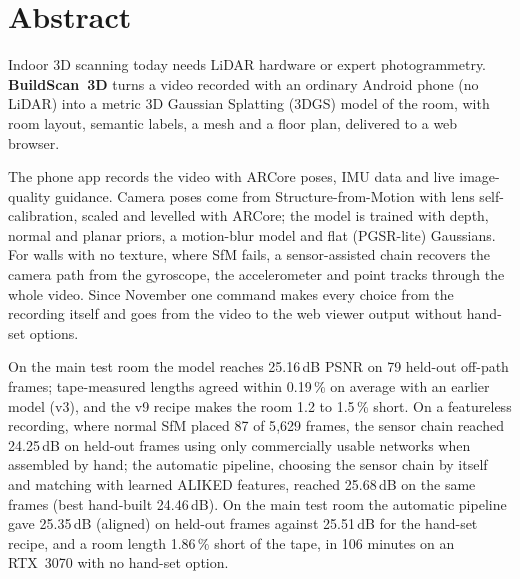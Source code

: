 \chapter*{Abstract}

Indoor 3D scanning today needs LiDAR hardware or expert photogrammetry. \textbf{BuildScan~3D} turns a video recorded
with an ordinary Android phone (no LiDAR) into a metric 3D Gaussian Splatting (3DGS) model of the room, with room
layout, semantic labels, a mesh and a floor plan, delivered to a web browser.

The phone app records the video with ARCore poses, IMU data and live image-quality guidance. Camera poses come from
Structure-from-Motion with lens self-calibration, scaled and levelled with ARCore; the model is trained with
depth, normal and planar priors, a motion-blur model and flat (PGSR-lite) Gaussians. For walls with no texture, where
SfM fails, a sensor-assisted chain recovers the camera path from the gyroscope, the accelerometer and point tracks
through the whole video. Since November one command makes every choice from the recording itself and goes from the
video to the web viewer output without hand-set options.

On the main test room the model reaches 25.16\,dB PSNR on 79 held-out off-path frames; tape-measured lengths agreed
within 0.19\,\% on average with an earlier model (v3), and the v9 recipe makes the room 1.2 to 1.5\,\% short. On a featureless recording, where normal SfM placed 87 of 5{,}629 frames, the sensor chain
reached 24.25\,dB on held-out frames using only commercially usable networks when assembled by hand; the automatic
pipeline, choosing the sensor chain by itself and matching with learned ALIKED features, reached 25.68\,dB on the
same frames (best hand-built 24.46\,dB). On the main test room the automatic pipeline gave 25.35\,dB (aligned) on
held-out frames against 25.51\,dB for the hand-set recipe, and a room length 1.86\,\% short of the tape, in 106
minutes on an RTX~3070 with no hand-set option.
